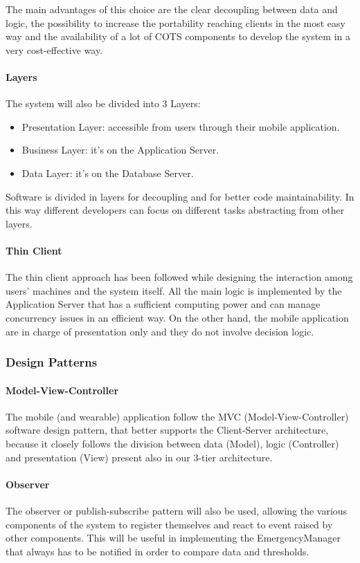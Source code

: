 The main advantages of this choice are the clear decoupling between data and logic, the possibility to increase the portability reaching clients in the most easy way and the availability of a lot of COTS components to  develop the system in a very cost-effective way.

\paragraph{Layers}
The system will also be divided into 3 Layers:
\begin{itemize}
\item Presentation Layer: accessible from users through their mobile application.
\item Business Layer: it's on the Application Server.
\item Data Layer: it's on the Database Server.
\end{itemize}
Software is divided in layers for decoupling and for better code maintainability. In this way different developers can focus on different tasks abstracting from other layers.

\paragraph{Thin Client}
The thin client approach has been followed while designing the interaction among users’ machines and the system itself. All the main logic is implemented by the Application Server that has a sufficient computing power and can manage concurrency issues in an efficient way. On the other hand, the mobile application are in charge of presentation only and they do not involve decision logic.

\subsubsection{Design Patterns}
\paragraph{Model-View-Controller}
The mobile (and wearable) application follow the MVC (Model-View-Controller) software design pattern, that better supports the Client-Server architecture, because it closely follows the division between data (Model), logic (Controller) and presentation (View) present also in our 3-tier architecture.

\paragraph{Observer}
The observer or publish-subscribe pattern will also be used, allowing the various components of the system to register themselves and react to event raised by other components. This will be useful in implementing the EmergencyManager that always has to be notified in order to compare data and thresholds.

